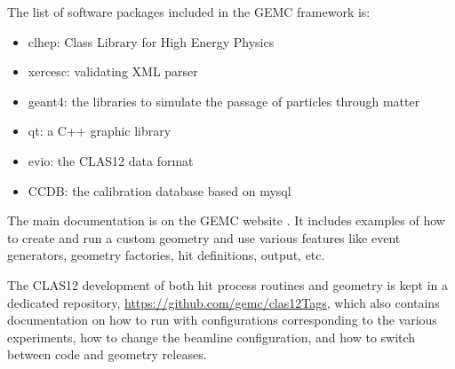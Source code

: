 The list of software packages included in the GEMC framework is:

\begin{itemize}
	\item clhep: Class Library for High Energy Physics \cite{clhep}
	\item xercesc: validating XML parser \cite{xercesc}
	\item geant4: the libraries to simulate the passage of particles through matter \cite{geant4}
	\item qt: a C++ graphic library \cite{qt}
	\item evio: the CLAS12 data format \cite{evio}
	\item CCDB: the calibration database based on mysql \cite{ccdb}
\end{itemize}

The main documentation is on the GEMC website \cite{gemc}. It includes examples of how to create and run a custom geometry
and use various features like event generators, geometry factories, hit definitions, output, etc.

The CLAS12 development of both hit process routines and geometry is kept in a dedicated repository, \url{https://github.com/gemc/clas12Tags},
which also contains documentation on how to run with configurations corresponding to the various experiments, how to change the
beamline configuration, and how to switch between code and geometry releases.





